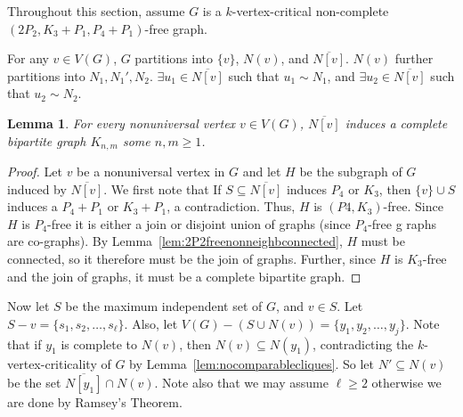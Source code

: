 \documentclass[11pt]{article}
\newtheorem{lemma}[theorem]{Lemma}
\theoremstyle{definition}
\newcommand{\forbid}{$(2P_2, K_3+P_1,P_4+P_1)$}
\newcommand{\noneighbs}{\overline{N[v]}}
\begin{document}
Throughout this section, assume $G$ is a $k$-vertex-critical non-complete \forbid -free graph.

For any $v\in V(G)$, $G$ partitions into $\{v\}$, $N(v)$, and $\overline{N[v]}$. $N(v)$ further partitions into $N_1, N_1', N_2$. $\exists u_1 \in \noneighbs$ such that $u_1 \sim N_1$, and $\exists u_2 \in \noneighbs$ such that $u_2 \sim N_2$.

\begin{lemma}\label{lem:completebipartite}
For every nonuniversal vertex $v\in V(G)$,  $\noneighbs$ induces a complete bipartite graph $K_{n,m}$ some $n,m\ge 1$.
\end{lemma}
\begin{proof}
Let $v$ be a nonuniversal vertex in $G$ and let $H$ be the subgraph of $G$ induced by $\noneighbs$. We first note that If $S\subseteq\noneighbs$ induces $P_4$ or $K_3$, then $\{v\}\cup S$ induces a $P_4+P_1$ or $K_3+P_1$, a contradiction. Thus, $H$ is $(P4, K_3)$-free. Since $H$ is $P_4$-free it is either a join or disjoint union of graphs (since $P_4$-free g raphs are co-graphs). By Lemma~\ref{lem:2P2freenonneighbconnected}, $H$ must be connected, so it therefore must be the join of graphs. Further, since $H$ is $K_3$-free and the join of graphs, it must be a complete bipartite graph. 
\end{proof}


Now let $S$ be the maximum independent set of $G$, and $v \in S$. Let $S - v = \{s_1, s_2, \dots, s_{\ell}\}$. Also, let $V(G) - (S \cup N(v)) = \{y_1, y_2, \dots, y_j\}$. Note that if $y_1$ is complete to $N(v)$, then $N(v)\subseteq N(y_1)$, contradicting the $k$-vertex-criticality of $G$ by Lemma~\ref{lem:nocomparablecliques}. So let $N' \subseteq N(v)$ be the set $\overline{N[y_1]}\cap N(v)$. Note also that we may assume $\ell\ge 2$ otherwise we are done by Ramsey's Theorem. 
\end{document}
